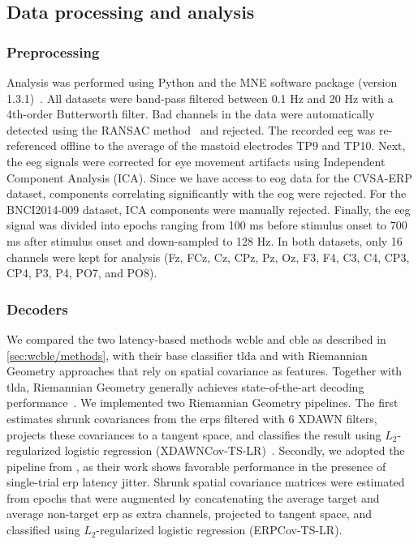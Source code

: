 \subsection{Data processing and analysis}
\subsubsection{Preprocessing}
Analysis was performed using Python and the MNE software package (version
1.3.1)~\cite{Gramfort2013}.
All datasets were band-pass filtered between 0.1 Hz and 20 Hz with a 4th-order Butterworth filter.
Bad channels in the data were automatically detected using the RANSAC
method~\cite{Fischler1981} and rejected.
The recorded \ac{eeg} was re-referenced
offline to the average of the mastoid electrodes TP9 and TP10.
Next, the \ac{eeg} signals were corrected for eye movement artifacts using
Independent Component Analysis (ICA).
Since we have access to \ac{eog} data for the CVSA-ERP dataset, components correlating
significantly with the \ac{eog} were rejected.
For the BNCI2014-009 dataset, ICA components were manually rejected.
Finally, the \ac{eeg} signal was divided into epochs ranging from 100 ms before stimulus onset to 700 ms after stimulus onset and down-sampled to 128 Hz.
In both datasets, only 16 channels were kept for
analysis (Fz, FCz, Cz, CPz, Pz, Oz, F3, F4, C3, C4, CP3, CP4, P3, P4, PO7, and
PO8).

\subsubsection{Decoders}%
\label{sec:covert-align/methods/decoders}
We compared the two latency-based methods \ac{wcble} and \ac{cble} as described in
\cref{sec:wcble/methods}, with their base classifier \ac{tlda} and with
Riemannian Geometry approaches that rely on spatial covariance as features.
Together with \ac{tlda}, Riemannian Geometry generally achieves state-of-the-art decoding
performance~\cite{Lotte2018}.
We implemented two Riemannian Geometry pipelines.
The first estimates shrunk covariances from the \acp{erp} filtered with 6 XDAWN
filters, projects these covariances to a tangent space, and classifies the
result using $L_2$-regularized logistic regression
(XDAWNCov-TS-LR)~\cite{Cecotti2017}.
Secondly, we adopted the pipeline from \textcite{Aydarkhanov2020}, as their work shows
favorable performance in the presence of single-trial \ac{erp} latency jitter.
Shrunk spatial covariance matrices were estimated from epochs that were
augmented by concatenating the average target and average non-target \ac{erp} as
extra channels, projected to tangent space, and classified using
$L_2$-regularized logistic regression (ERPCov-TS-LR).


